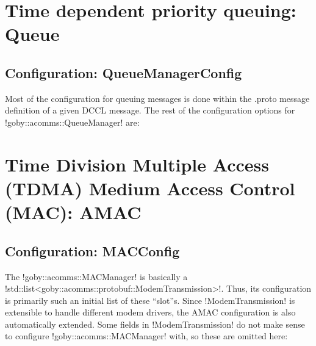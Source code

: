 \section{Time dependent priority queuing: Queue} \label{sec:queue}

\subsection{Configuration: QueueManagerConfig}

Most of the configuration for queuing messages is done within the .proto message definition of a given DCCL message. The rest of the configuration options for !goby::acomms::QueueManager! are:

\resetbvlinenumber

\section{Time Division Multiple Access (TDMA) Medium Access Control (MAC): AMAC} \label{sec:amac}

\subsection{Configuration: MACConfig}

The !goby::acomms::MACManager! is basically a !std::list<goby::acomms::protobuf::ModemTransmission>!. Thus, its configuration is primarily such an initial list of these ``slot''s. Since !ModemTransmission! is extensible to handle different modem drivers, the AMAC configuration is also automatically extended. Some fields in !ModemTransmission! do not make sense to configure !goby::acomms::MACManager! with, so these are omitted here:

\resetbvlinenumber


